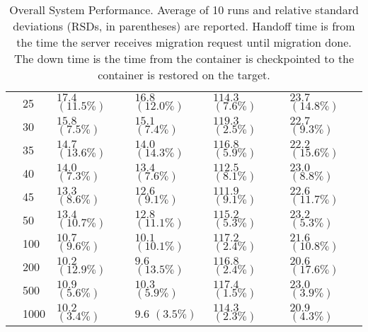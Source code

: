 \begin{table}[h]
{\begin{tabular}{|P{3.5em}|P{1.8em}|P{5em}|P{5em}|P{5em}|P{5em}|}
&25	&$17.4$ $(11.5\%)$	&$16.8$ $(12.0\%)$	&$114.3$ $(7.6\%)$	&$23.7$ $(14.8\%)$\\
&30	&$15.8$ $(7.5\%)$	&$15.1$ $(7.4\%)$	&$119.3$ $(2.5\%)$	&$22.7$ $(9.3\%)$\\
&35	&$14.7$ $(13.6\%)$	&$14.0$ $(14.3\%)$	&$116.8$ $(5.9\%)$	&$22.2$ $(15.6\%)$\\
&40	&$14.0$ $(7.3\%)$	&$13.4$ $(7.6\%)$	&$112.5$ $(8.1\%)$	&$23.0$ $(8.8\%)$\\
&45	&$13.3$ $(8.6\%)$	&$12.6$ $(9.1\%)$	&$111.9$ $(9.1\%)$	&$22.6$ $(11.7\%)$\\
&50	&$13.4$ $(10.7\%)$	&$12.8$ $(11.1\%)$	&$115.2$ $(5.3\%)$	&$23.2$ $(5.3\%)$\\
&100	&$10.7$ $(9.6\%)$	&$10.1$ $(10.1\%)$	&$117.2$ $(2.4\%)$	&$21.6$ $(10.8\%)$\\
&200	&$10.2$ $(12.9\%)$	&$9.6$ $(13.5\%)$	&$116.8$ $(2.4\%)$	&$20.6$ $(17.6\%)$\\
&500	&$10.9$ $(5.6\%)$	&$10.3$ $(5.9\%)$	&$117.4$ $(1.5\%)$	&$23.0$ $(3.9\%)$\\
&1000	&$10.2$ $(3.4\%)$	&$9.6$ $(3.5\%)$	&$114.3$ $(2.3\%)$	&$20.9$ $(4.3\%)$\\
\end{tabular}
}
\caption{ Overall System Performance. Average of 10 runs and relative standard deviations (RSDs, in parentheses) are reported. Handoff time is from the time the server receives migration request until migration done. The down time is the time from the container is checkpointed to the container is restored on the target.
}
\label{tab:all}
\end{table}





